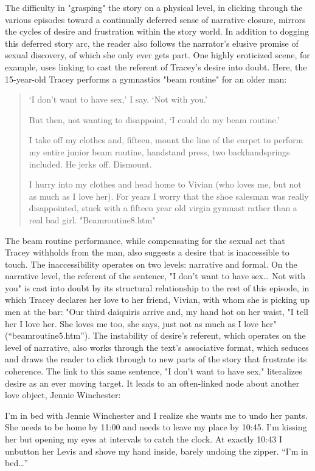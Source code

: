 \documentclass[11pt]{article}
\begin{document}
The difficulty in "grasping" the story on a physical level, in
clicking through the various episodes toward a continually deferred
sense of narrative closure, mirrors the cycles of desire and
frustration within the story world. In addition to dogging this
deferred story arc, the reader also follows the narrator's elusive
promise of sexual discovery, of which she only ever gets part. One
highly eroticized scene, for example, uses linking to cast the
referent of Tracey's desire into doubt. Here, the 15-year-old Tracey
performs a gymnastics "beam routine" for an older man:
\begin{quote}
‘I don’t want to have sex,’ I say. ‘Not with you.’

But then, not wanting to disappoint, ‘I could do my beam routine.’  

I take off my clothes and, fifteen, mount the line of the carpet to
perform my entire junior beam routine, handstand press, two
backhandsprings included. He jerks off. Dismount.  

I hurry into my clothes and head home to Vivian (who loves me, but not
as much as I love her). For years I worry that the shoe salesman was
really disappointed, stuck with a fifteen year old virgin gymnast
rather than a real bad girl. "Beamroutine8.htm"
\end{quote}
The beam routine performance, while compensating for the sexual act
that Tracey withholds from the man, also suggests a desire that is
inaccessible to touch. The inaccessibility operates on two levels:
narrative and formal. On the narrative level, the referent of the
sentence, "I don't want to have sex\ldots{} Not with you" is cast into
doubt by its structural relationship to the rest of this episode, in
which Tracey declares her love to her friend, Vivian, with whom she is
picking up men at the bar: "Our third daiquiris arrive and, my hand
hot on her waist, "I tell her I love her. She loves me too, she says,
just not as much as I love her" (“beamroutine5.htm”). The instability
of desire's referent, which operates on the level of narrative, also
works through the text's associative format, which seduces and draws
the reader to click through to new parts of the story that frustrate
its coherence. The link to this same sentence, "I don't want to have
sex," literalizes desire as an ever moving target. It leads to an
often-linked node about another love object, Jennie Winchester:
\begin{source}
I’m in bed with Jennie Winchester and I realize she wants me to undo
her pants. She needs to be home by 11:00 and needs to leave my place
by 10:45. I’m kissing her but opening my eyes at intervals to catch
the clock. At exactly 10:43 I unbutton her Levis and shove my hand
inside, barely undoing the zipper. “I’m in bed…”
\end{source}
\end{document}
